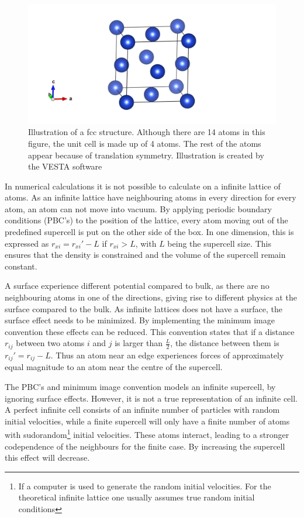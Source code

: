 \begin{figure}[H]
	\centering
	\includegraphics[width=0.7\linewidth]{../figures/fcc.jpg}
	\caption{Illustration of a fcc structure. Although there are 14 atoms in this figure, the unit cell is made up of 4 atoms. The rest of the atoms appear because of translation symmetry. Illustration is created by the VESTA software \cite{VESTA}}
	\label{fig:fcc}
\end{figure}

In numerical calculations it is not possible to calculate on a infinite lattice of atoms. As an infinite lattice have neighbouring atoms in every direction for every atom, an atom can not move into vacuum. By applying periodic boundary conditions (PBC's) to the position of the lattice, every atom moving out of the predefined supercell is put on the other side of the box. In one dimension, this is expressed as $ r_{xi} = r_{xi}' - L $ if $ r_{xi} >L $, with $ L $ being the supercell size. This ensures that the density is constrained and the volume of the supercell remain constant. 

A surface experience different potential compared to bulk, as there are no neighbouring atoms in one of the directions, giving rise to different physics at the surface compared to the bulk. As infinite lattices does not have a surface, the surface effect needs to be minimized. By implementing the minimum image convention these effects can be reduced. This convention states that if a distance $ r_{ij} $ between two atoms $ i $ and $ j $ is larger than $ \frac{L}{2} $, the distance between them is $  r_{ij}'  = r_{ij}-L$. Thus an atom  near an edge experiences forces of approximately equal magnitude to an atom near the centre of the supercell. 

The PBC's and minimum image convention models an infinite supercell, by ignoring surface effects. However, it is not a true representation of an infinite cell. A perfect infinite cell consists of an infinite number of particles with random initial velocities, while a finite supercell will only have a finite number of atoms with sudorandom\footnote{If a computer is used to generate the random initial velocities. For the theoretical infinite lattice one usually assumes true random initial conditions} initial velocities. These atoms interact, leading to a stronger codependence of the neighbours for the finite case. By increasing the supercell this effect will decrease.   
 	

